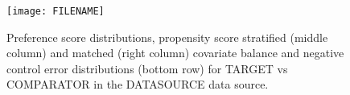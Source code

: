 \begin{figure}
	\caption{Preference score distributions,
	propensity score stratified (middle column) and matched (right column) covariate balance
	and negative control error distributions (bottom row) for
	TARGET vs COMPARATOR in the DATASOURCE data source.}
	\centerline{
  		\texttt{[image: FILENAME]}
  	}
\end{figure}
